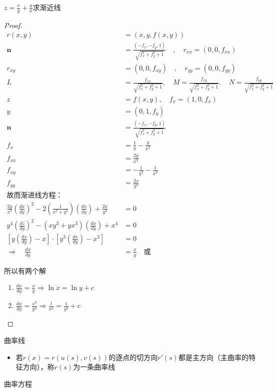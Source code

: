 \documentclass[lang=cn,10pt,thmcnt=section]{elegantbook}
\renewcommand{\vec}[1]{\mathbf{#1}}
\begin{document}
\begin{example}
    $z=\frac{x}{y}+\frac{y}{x}$求渐近线
\end{example}
\begin{proof}
    \begin{align*}
        r(x,y) &= (x, y, f(x,y)) \\
        \vec{n} &= \frac{(-f_x, -f_y, 1)}{\sqrt{f_x^2 + f_y^2 + 1}} \quad , \quad r_{xx} = (0, 0, f_{xx}) \\
        r_{xy} &= (0, 0, f_{xy}) \quad , \quad r_{yy} = (0, 0, f_{yy}) \\
        L &= \frac{f_{xx}}{\sqrt{f_x^2 + f_y^2 + 1}}, \quad M = \frac{f_{xy}}{\sqrt{f_x^2 + f_y^2 + 1}}, \quad N = \frac{f_{yy}}{\sqrt{f_x^2 + f_y^2 + 1}} \\   
        z &= f(x, y), \quad f_x = (1, 0, f_x) \\
        y &= (0, 1, f_y) \\
        \vec{n} &= \frac{(-f_x, -f_y, 1)}{\sqrt{f_x^2 + f_y^2 + 1}} \\
        f_x &= \frac{1}{y} - \frac{y}{x^2} \\
        f_{xx} &= \frac{2y}{x^3} \\
        f_{xy} &= -\frac{1}{y^2} - \frac{1}{x^2} \\
        f_{yy} &= \frac{2x}{y^3} \\ 
            \text{故而渐进线方程：} & \\
            \frac{2y}{x^3} \left( \frac{dx}{dy} \right)^2 
              - 2 \left( \frac{1}{x^2 + y^2} \right) \left( \frac{dx}{dy} \right) 
              + \frac{2x}{y^3} &= 0 \\
            y^4 \left( \frac{dz}{dy} \right)^2 
              - (xy^3 + yx^3) \left( \frac{dx}{dy} \right) 
              + x^4 &= 0 \\
            \left[ y \left( \frac{dx}{dy} \right) - x \right] 
              \cdot \left[ y^3 \left( \frac{dx}{dy} \right) - x^3 \right] &= 0 \\
            \Rightarrow \quad \frac{dx}{dy} &= \frac{x}{y} \quad \text{或} \quad 
            \end{align*}
            
            所以有两个解
            \begin{enumerate}
                \item $\frac{dx}{dy} = \frac{x}{y} \Rightarrow \ln x = \ln y + c $
                \item $\frac{dx}{dy} = \frac{x^3}{y^3}\Rightarrow \frac{l}{x^2} = \frac{1}{y^2} + c $
            \end{enumerate}     
\end{proof}
曲率线
\begin{itemize}
    \item 若$r(x)=r(u(s),v(s))$的逐点的切方向$r'(s)$都是主方向（主曲率的特征方向），称$r(s)$为一条曲率线
\end{itemize}
曲率方程 
\end{document}
